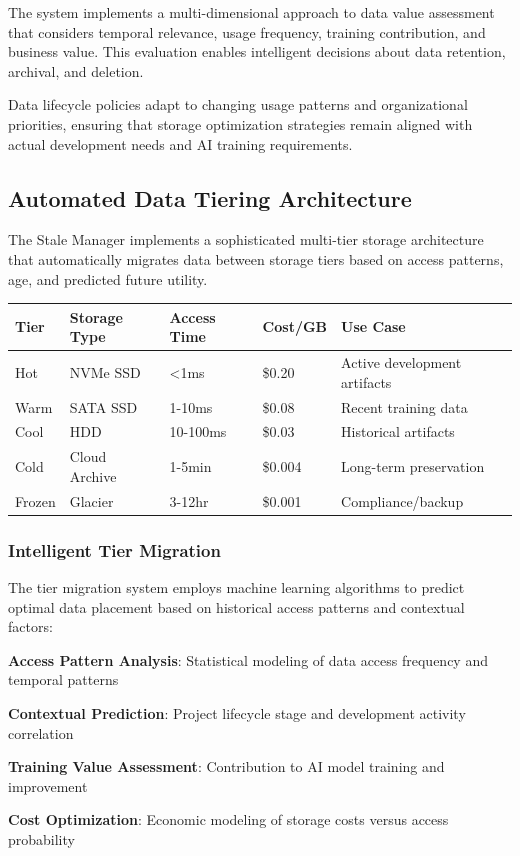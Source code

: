 The system implements a multi-dimensional approach to data value assessment that considers temporal relevance, usage frequency, training contribution, and business value. This evaluation enables intelligent decisions about data retention, archival, and deletion.

Data lifecycle policies adapt to changing usage patterns and organizational priorities, ensuring that storage optimization strategies remain aligned with actual development needs and AI training requirements.

\subsection*{Automated Data Tiering Architecture}

The Stale Manager implements a sophisticated multi-tier storage architecture that automatically migrates data between storage tiers based on access patterns, age, and predicted future utility.

\begin{center}
\begin{tabular}{@{}lllll@{}}
\toprule
\textbf{Tier} & \textbf{Storage Type} & \textbf{Access Time} & \textbf{Cost/GB} & \textbf{Use Case} \\
\midrule
Hot & NVMe SSD & <1ms & \$0.20 & Active development artifacts \\
Warm & SATA SSD & 1-10ms & \$0.08 & Recent training data \\
Cool & HDD & 10-100ms & \$0.03 & Historical artifacts \\
Cold & Cloud Archive & 1-5min & \$0.004 & Long-term preservation \\
Frozen & Glacier & 3-12hr & \$0.001 & Compliance/backup \\
\bottomrule
\end{tabular}
\end{center}

\subsubsection*{Intelligent Tier Migration}

The tier migration system employs machine learning algorithms to predict optimal data placement based on historical access patterns and contextual factors:

\begin{expandedlist}
    \item \textbf{Access Pattern Analysis}: Statistical modeling of data access frequency and temporal patterns
    \item \textbf{Contextual Prediction}: Project lifecycle stage and development activity correlation
    \item \textbf{Training Value Assessment}: Contribution to AI model training and improvement
    \item \textbf{Cost Optimization}: Economic modeling of storage costs versus access probability
\end{expandedlist}

